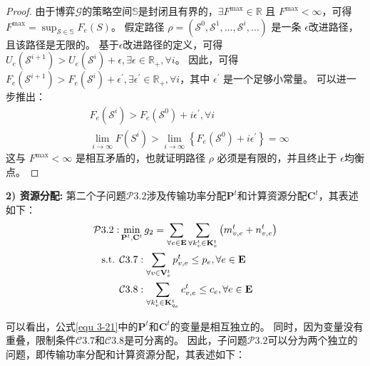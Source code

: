 \begin{proof}
由于博弈$\mathcal{G}$的策略空间$\mathbb{S}$是封闭且有界的，$\exists F^{\max} \in \mathbb{R}$ 且 $F^{\max} < \infty$，可得$F^{\max} = \sup _{\mathcal{S} \in \mathbb{S}} F_{e}(S)$。
假定路径 $\rho=\left(\mathcal{S}^{0}, \mathcal{S}^{1}, \ldots, \mathcal{S}^{i}, \ldots\right)$ 是一条 $\epsilon$改进路径，且该路径是无限的。
基于$\epsilon$改进路径的定义，可得$U_{e}\left(\mathcal{S}^{i+1}\right) > U_{e}\left(\mathcal{S}^{i}\right) + \epsilon, \exists \epsilon \in \mathbb{R}_{+}, \forall i$。
因此，可得$F_{e}\left(\mathcal{S}^{i+1}\right) > F_{e}\left(\mathcal{S}^{i}\right) + \epsilon^{\prime}, \exists \epsilon^{\prime} \in \mathbb{R}_{+}, \forall i$，其中 $\epsilon^{\prime}$ 是一个足够小常量。
可以进一步推出：
\begin{align}
	&F_{e}\left(\mathcal{S}^{i}\right) > F_{e}\left(\mathcal{S}^{0}\right) + i   \epsilon^{\prime}, \forall i \\
	&\lim _{i \rightarrow \infty} F\left(S^{i}\right) > \lim _{i \rightarrow \infty} \left \{ F_{e}\left(\mathcal{S}^{0}\right) + i   \epsilon^{\prime} \right\} =\infty
\end{align}
这与 $F^{\max} < \infty$ 是相互矛盾的，也就证明路径 $\rho$ 必须是有限的，并且终止于 $\epsilon$均衡点。
\end{proof}

\textbf{2) 资源分配:} 第二个子问题$\mathcal{P}3.2$涉及传输功率分配$\mathbf{P}^{t}$和计算资源分配$\mathbf{C}^{t}$，其表述如下：
\begin{align}
	\mathcal{P}3.2: &\min_{\mathbf{P}^{t}, \mathbf{C}^{t}} g_2= \sum_{ \forall e \in \mathbf{E}} \sum_{\forall k_{v}^{t} \in \mathbf{K}_{e}^{t}} \left( m_{v, e}^{t} +  n_{v, e}^{t} \right) \notag \\
	\text { s.t. }
    &\mathcal{C}3.7: \sum_{\forall v \in \mathbf{V}_{e}^{t}} p_{v, e}^{t} \leq p_{e}, \forall e \in \mathbf{E} \notag \\
    &\mathcal{C}3.8: \sum_{\forall k_{v}^{t} \in {\mathbf{K}_{q_e}^{t} }} c_{v, e}^t \leq c_{e}, \forall e \in \mathbf{E}
\label{equ 3-21}
\end{align}

\noindent 可以看出，公式\ref{equ 3-21}中的$\mathbf{P}^{t}$和$\mathbf{C}^{t}$的变量是相互独立的。
同时，因为变量没有重叠，限制条件$\mathcal{C}3.7$和$\mathcal{C}3.8$是可分离的。
因此，子问题$\mathcal{P}3.2$可以分为两个独立的问题，即传输功率分配和计算资源分配，其表述如下：

